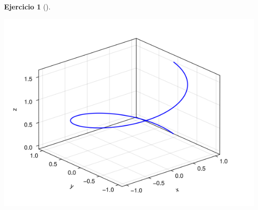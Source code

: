 \documentclass[
  a4paper,
]{scrreport}
\theoremstyle{definition}
\newtheorem{exercise}{Ejercicio}[chapter]
\theoremstyle{remark}
\begin{document}
\begin{exercise}[]
\begin{enumerate}
\begin{tcolorbox}
  \includegraphics{08-funciones-vectoriales_files/figure-pdf/cell-12-output-1.png}

  \end{tcolorbox}
\end{enumerate}

\end{exercise}
\end{document}
